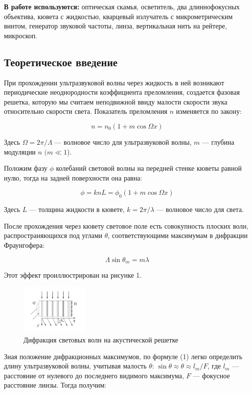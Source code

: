 \documentclass[a4paper, 12pt]{article}%
\begin{document}
	\textbf{В работе используются:} оптическая скамья, осветитель, два длиннофокусных объектива, кювета с жидкостью, кварцевый излучатель с микрометрическим винтом, генератор звуковой частоты, линза, вертикальная нить на рейтере, микроскоп.
	
	\subsection{Теоретическое введение}	
	При прохождении ультразвуковой волны через жидкость в ней возникают периодические неоднородности коэффициента преломления, создается фазовая решетка, которую мы считаем неподвижной ввиду малости скорости звука относительно скорости света. Показатель
	преломления $n$ изменяется по закону:
	
	\begin{equation}\label{}
	n = n_0 (1 + m \cos \Omega x)
	\end{equation}
	
	Здесь $ \Omega = 2 \pi / \Lambda $ --- волновое число для ультразвуковой волны, $ m $ --- глубина модуляции $ n $ $ (m \ll 1 $).
	
	Положим фазу $ \phi $ колебаний световой волны на передней стенке кюветы равной нулю, тогда на задней поверхности она равна:
	
	\begin{equation}\label{}
	\phi  = k n L = \phi_0 (1 + m \cos \Omega x)
	\end{equation}
	
	Здесь $ L $ --- толщина жидкости в кювете, $ k = 2 \pi / \lambda $ --- волновое число для света.
	
	После прохождения через кювету световое поле есть совокупность плоских волн, распространяющихся под углами $ \theta $, соответствующими максимумам в дифракции Фраунгофера:
	
\begin{equation}\label{}	
	\Lambda \sin \theta_m = m \lambda
\end{equation}

	Этот эффект проиллюстрирован на рисунке 1.
	\begin{figure}[h!]
		\centering	
		\includegraphics[width=0.3\textwidth]{pic/wave.png}
		\caption{Дифракция световых волн на акустической решетке}
		\label{diff}
	\end{figure}
    Зная положение дифракционных максимумов, по формуле (1) легко определить длину ультразвуковой волны, учитывая малость $ \theta $: $ \sin \theta \approx \theta \approx l_m /F  $, где $ l_m $ --- расстояние от нулевого до последнего видимого максимума, $ F $ --- фокусное расстояние линзы. Тогда получим:
    	
\end{document}
